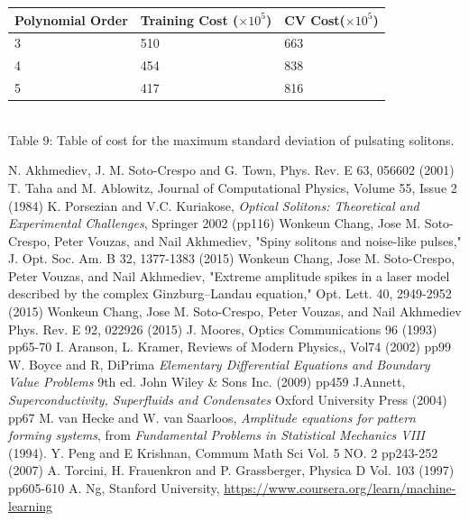 \documentclass[a4paper,12pt]{report}
\begin{document}
\pagebreak
\begin{center}
\begin{tabular}{|l|l|l|}
\hline
Polynomial Order & Training Cost ($\times 10^5$) & CV Cost($\times 10^5$)\\
\hline
3&510&663\\
4&454&838\\
5&417&816\\
\hline
\end{tabular}
\\Table 9: Table of cost for the maximum standard deviation of pulsating solitons.
\end{center}


\begin{thebibliography}{9}
    N. Akhmediev, J. M. Soto-Crespo and G. Town, Phys. Rev. E 63, 056602 (2001)
	T. Taha and M. Ablowitz, Journal of Computational Physics, Volume 55, Issue 2 (1984)
    K. Porsezian and V.C. Kuriakose, \emph{Optical Solitons: Theoretical and Experimental Challenges}, Springer 2002 (pp116)
	Wonkeun Chang, Jose M. Soto-Crespo, Peter Vouzas, and Nail Akhmediev, "Spiny solitons and noise-like pulses," J. Opt. Soc. Am. B 32, 1377-1383 (2015)
	Wonkeun Chang, Jose M. Soto-Crespo, Peter Vouzas, and Nail Akhmediev, "Extreme amplitude spikes in a laser model described by the complex Ginzburg–Landau equation," Opt. Lett. 40, 2949-2952 (2015)
	Wonkeun Chang, Jose M. Soto-Crespo, Peter Vouzas, and Nail Akhmediev
Phys. Rev. E 92, 022926 (2015)
	J. Moores, Optics Communications 96 (1993) pp65-70
	I. Aranson, L. Kramer, Reviews of Modern Physics,, Vol74 (2002) pp99
	W. Boyce and R, DiPrima \emph{Elementary Differential Equations and Boundary Value Problems} 9th ed. John Wiley \& Sons Inc. (2009) pp459 
	J.Annett, \emph{Superconductivity, Superfluids and Condensates} Oxford University Press (2004) pp67
	M. van Hecke and W. van Saarloos, \emph{Amplitude equations for pattern forming systems}, from \emph{Fundamental Problems in Statistical Mechanics VIII} (1994).
	Y. Peng and E Krishnan, Commum Math Sci Vol. 5 NO. 2 pp243-252 (2007)
	A. Torcini, H. Frauenkron and P. Grassberger, Physica D Vol. 103 (1997) pp605-610
A. Ng, Stanford University, \url{https://www.coursera.org/learn/machine-learning}
	
\end{thebibliography}
\end{document}
